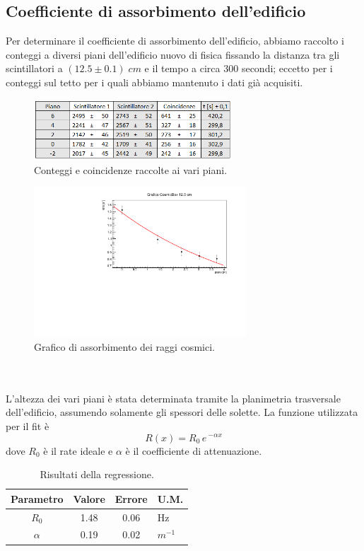 \documentclass[11pt]{article} %
\begin{document}
\subsection{Coefficiente di assorbimento dell'edificio}
Per determinare il coefficiente di assorbimento dell'edificio, abbiamo raccolto i conteggi a diversi piani dell'edificio nuovo di fisica fissando la distanza tra gli scintillatori a $\left(12.5\pm0.1\right)\;cm$ e il tempo a circa 300 secondi; eccetto per i conteggi sul tetto per i quali abbiamo mantenuto i dati già acquisiti.
\begin{figure}[h!]
\begin{center}
\includegraphics[width=280px]{img/CB4.PNG}
\caption{Conteggi e coincidenze raccolte ai vari piani.}
\label{fig:CBa}
\end{center}
\end{figure}
\begin{figure}[h!]
\begin{center}
\includegraphics[width=300px]{img/CBexp.pdf}
\caption{Grafico di assorbimento dei raggi cosmici.}
\label{fig:CBexp}
\end{center}
\end{figure}
\\\\ L'altezza dei vari piani è stata determinata tramite la planimetria trasversale dell'edificio, assumendo solamente gli spessori delle solette. La funzione utilizzata per il fit è
\begin{equation}
R\left(x\right)=R_{0}\,e\,^{-\alpha x}
\end{equation}
dove $R_0$ è il rate ideale e $\alpha$ è il coefficiente di attenuazione.
\begin{table}[!h]
\begin{center}
\begin{tabular}{|c|c|c|l|}
\hline
\multicolumn{1}{|l|}{Parametro} & \multicolumn{1}{l|}{Valore} & \multicolumn{1}{l|}{Errore} & U.M. \\ \hline
$R_0$                               & 1.48                       & 0.06                       &    Hz  \\ \hline
$\alpha$                               & 0.19                       & 0.02                          & $m^{-1}$   \\ \hline
\end{tabular}
\end{center}
\caption{Risultati della regressione.}
\end{table}
\end{document}
